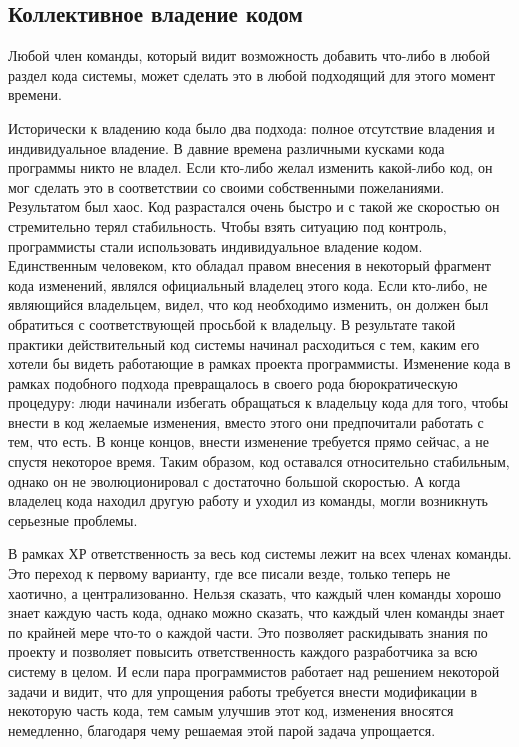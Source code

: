 \documentclass{../../text-style}
\begin{document}
\subsection{Коллективное владение кодом}

Любой член команды, который видит возможность добавить что-либо в любой раздел кода системы, может сделать это в любой подходящий для этого момент времени.

Исторически к владению кода было два подхода: полное отсутствие владения и индивидуальное владение. В давние времена различными кусками кода программы никто не владел. Если кто-либо желал изменить какой-либо код, он мог сделать это в соответствии со своими собственными пожеланиями. Результатом был хаос. Код разрастался очень быстро и с такой же скоростью он стремительно терял стабильность. Чтобы взять ситуацию под контроль, программисты стали использовать индивидуальное владение кодом. Единственным человеком, кто обладал правом внесения в некоторый фрагмент кода изменений, являлся официальный владелец этого кода. Если кто-либо, не являющийся владельцем, видел, что код необходимо изменить, он должен был обратиться с соответствующей просьбой к владельцу. В результате такой практики действительный код системы начинал расходиться с тем, каким его хотели бы видеть работающие в рамках проекта программисты. Изменение кода в рамках подобного подхода превращалось в своего рода бюрократическую процедуру: люди начинали избегать обращаться к владельцу кода для того, чтобы внести в код желаемые изменения, вместо этого они предпочитали работать с тем, что есть. В конце концов, внести изменение требуется прямо сейчас, а не спустя некоторое время. Таким образом, код оставался относительно стабильным, однако он не эволюционировал с достаточно большой скоростью. А когда владелец кода находил другую работу и уходил из команды, могли возникнуть серьезные проблемы.

В рамках ХР ответственность за весь код системы лежит на всех членах команды. Это переход к первому варианту, где все писали везде, только теперь не хаотично, а централизованно. Нельзя сказать, что каждый член команды хорошо знает каждую часть кода, однако можно сказать, что каждый член команды знает по крайней мере что-то о каждой части. Это позволяет раскидывать знания по проекту и позволяет повысить ответственность каждого разработчика за всю систему в целом. И если пара программистов работает над решением некоторой задачи и видит, что для упрощения работы требуется внести модификации в некоторую часть кода, тем самым улучшив этот код, изменения вносятся немедленно, благодаря чему решаемая этой парой задача упрощается.
\end{document}
